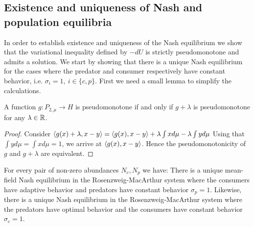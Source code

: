 \subsection{Existence and uniqueness of Nash and population equilibria}
In order to establish existence and uniqueness of the Nash equilibrium we show that the variational inequality defined by $-dU$ is strictly pseudomonotone and admits a solution. We start by showing that there is a unique Nash equilibrium for the cases where the predator and consumer respectively have constant behavior, i.e. $\sigma_i = 1,~i\in \{c,p\}$. First we need a small lemma to simplify the calculations.
\begin{lemma}
  \label{lem:pseudo_reduc}
  A function $g: P_{2,\mu} \to H$ is pseudomonotone if and only if $g+\lambda$ is pseudomonotone for any $\lambda \in \mathbb{R}$.
\end{lemma}
\begin{proof}
  Consider $\left \langle g(x)+\lambda,x-y \right \rangle=\left \langle g(x),x-y \right \rangle+\lambda \int x d\mu - \lambda \int y d\mu$
  Using that $\int y d\mu = \int x d\mu = 1$, we arrive at  $\left \langle g(x),x-y \right \rangle$.
  Hence the pseudomonotonicity of $g$ and $g+\lambda$ are equivalent.
\end{proof}
\begin{proposition}
  \label{prop:sing_spec_un_nash}
  For every pair of non-zero abundances $N_c,N_p$ we have:
  There is a unique mean-field Nash equilibrium in the Rosenzweig-MacArthur system where the consumers have adaptive behavior and predators have constant behavior $\sigma_p = 1$.
  Likewise, there is a unique Nash equilibrium in the Rosenzweig-MacArthur system where the predators have optimal behavior and the consumers have constant behavior $\sigma_c = 1$.
\end{proposition}
